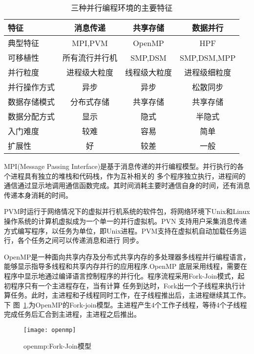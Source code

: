     \begin{table}[htbp]
    \centering  %
    \begin{tabular}{lccc}  %
    \hline
    特征&消息传递&共享存储&数据并行\\ \hline 
    典型特征&MPI,PVM&OpenMP&HPF\\        
    可移植性&所有流行并行机&SMP,DSM&SMP,DSM,MPP\\      
    并行粒度&进程级大粒度&线程级大粒度&进程级细粒度\\     
    并行操作方式&异步&异步&松散同步\\   
    数据存储模式&分布式存储&共享存储&共享存储\\
    数据分配方式&显示&隐式&半隐式\\
    入门难度&较难&容易&简单　\\
    扩展性&好&较差&一般\\ \hline
    \end{tabular}
    \caption{三种并行编程环境的主要特征}
    \end{table}

    MPI(Message Passing Interface)是基于消息传递的并行编程模型。并行执行的各个进程具有独立的堆栈和代码栈，作为互补相关的
多个程序独立执行，进程间的通信通过显示地调用通信函数完成。其时间消耗主要时通信自身的时间，还有消息传递本身消耗的时间\cite{Zhangwusheng}。

    PVM时运行于网络情况下的虚拟并行机系统的软件包，将网络环境下Unix和Linux操作系统的计算机虚拟成为一个单一的并行虚拟机。PVN
支持用户采集消息传递方式编写程序，以任务为单位，即Unix进程。PVM支持在虚拟机自动加载任务运行，各个任务之间可以传递消息和进行
同步\cite{Wanglei}。

    OpenMP是一种面向共享内存及分布式共享内存的多处理器多线程并行编程语言，能够显示指导多线程和共享内存并行的应用程序.OpenMP
底层采用线程，需要在程序中显示地通过编译语言控制程序的并行化。程序流程采用Fork-Join模式，起初程序只有一个主进程存在，当有计算
任务到达时，Fork出一个子线程来执行计算任务。此时，主进程和子线程同时工作，在子线程推出后，主进程继续其工作。下
图~\ref{fig:openmp},为OpenMP的Fork-join模型。主进程产生4个工作子线程，等待4个子线程完成任务后汇合到主进程，主进程之后推出。

    \begin{figure}[htbp]
    \centering
    \texttt{[image: openmp]}
    \caption{openmp:Fork-Join模型}\label{fig:openmp}
    \vspace{\baselineskip}
    \end{figure}

